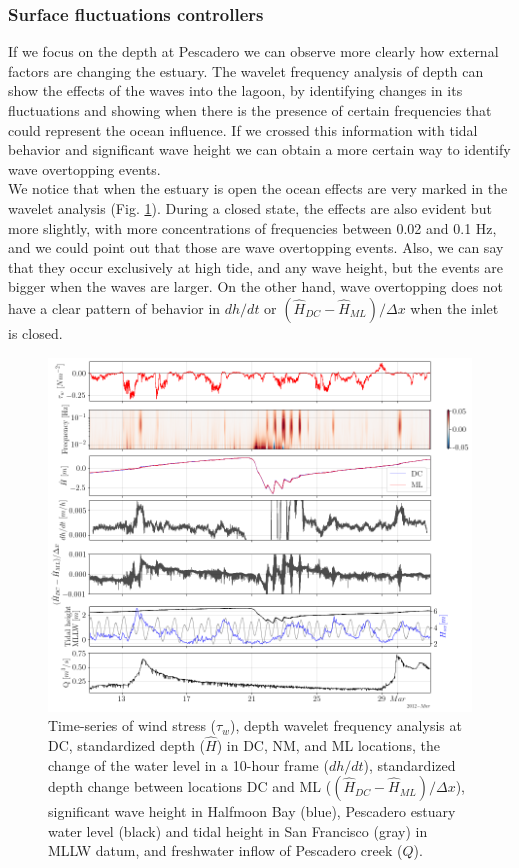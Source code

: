 \documentclass[tesis.tex]{subfiles}
\begin{document}
\subsubsection{Surface fluctuations controllers}

If we focus on the depth at Pescadero we can observe more clearly how external factors are changing the estuary. The wavelet frequency analysis of depth can show the effects of the waves into the lagoon, by identifying changes in its fluctuations and showing when there is the presence of certain frequencies that could represent the ocean influence. If we crossed this information with tidal behavior and significant wave height we can obtain a more certain way to identify wave overtopping events. \\

We notice that when the estuary is open the ocean effects are very marked in the wavelet analysis (Fig. \ref{fig:surf}). During a closed state, the effects are also evident but more slightly, with more concentrations of frequencies between 0.02 and 0.1 Hz, and we could point out that those are wave overtopping events. Also, we can say that they occur exclusively at high tide, and any wave height, but the events are bigger when the waves are larger. On the other hand, wave overtopping does not have a clear pattern of behavior in $dh/dt$ or $(\hat{H}_{DC}-\hat{H}_{ML})/\Delta x$ when the inlet is closed.\\

\begin{figure}[h!]
    \centering
    \includegraphics[width=\textwidth]{Imagenes/surf.png}
    \caption{Time-series of wind stress ($\tau_w$), depth wavelet frequency analysis at DC, standardized depth ($\hat{H}$) in DC, NM, and ML locations, the change of the water level in a 10-hour frame ($dh/dt$), standardized depth change between locations DC and ML ($(\hat{H}_{DC}-\hat{H}_{ML})/\Delta x$), significant wave height in Halfmoon Bay (blue), Pescadero estuary water level (black) and tidal height in San Francisco (gray) in MLLW datum, and freshwater inflow of Pescadero creek ($Q$).}
    \label{fig:surf}
\end{figure}
\end{document}
